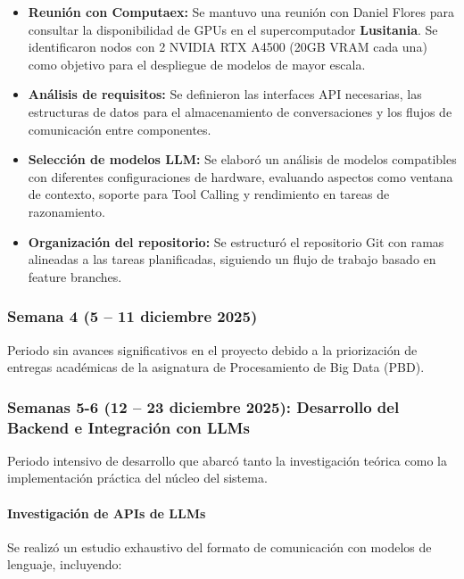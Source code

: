 \documentclass[12pt,a4paper]{article}
\begin{document}
\begin{itemize}
    \item \textbf{Reunión con Computaex:} Se mantuvo una reunión con Daniel Flores para consultar la disponibilidad de GPUs en el supercomputador \textbf{Lusitania}. Se identificaron nodos con 2 NVIDIA RTX A4500 (20GB VRAM cada una) como objetivo para el despliegue de modelos de mayor escala.
    
    \item \textbf{Análisis de requisitos:} Se definieron las interfaces API necesarias, las estructuras de datos para el almacenamiento de conversaciones y los flujos de comunicación entre componentes.
    
    \item \textbf{Selección de modelos LLM:} Se elaboró un análisis de modelos compatibles con diferentes configuraciones de hardware, evaluando aspectos como ventana de contexto, soporte para Tool Calling y rendimiento en tareas de razonamiento.
    
    \item \textbf{Organización del repositorio:} Se estructuró el repositorio Git con ramas alineadas a las tareas planificadas, siguiendo un flujo de trabajo basado en feature branches.
\end{itemize}

\subsubsection{Semana 4 (5 -- 11 diciembre 2025)}

Periodo sin avances significativos en el proyecto debido a la priorización de entregas académicas de la asignatura de Procesamiento de Big Data (PBD).

\subsubsection{Semanas 5-6 (12 -- 23 diciembre 2025): Desarrollo del Backend e Integración con LLMs}

Periodo intensivo de desarrollo que abarcó tanto la investigación teórica como la implementación práctica del núcleo del sistema.

\paragraph{Investigación de APIs de LLMs}

Se realizó un estudio exhaustivo del formato de comunicación con modelos de lenguaje, incluyendo:
\end{document}
